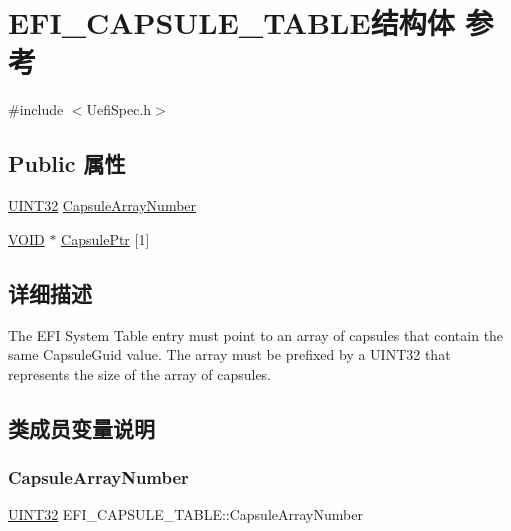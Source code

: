 \hypertarget{struct_e_f_i___c_a_p_s_u_l_e___t_a_b_l_e}{}\section{E\+F\+I\+\_\+\+C\+A\+P\+S\+U\+L\+E\+\_\+\+T\+A\+B\+L\+E结构体 参考}
\label{struct_e_f_i___c_a_p_s_u_l_e___t_a_b_l_e}


{\ttfamily \#include $<$Uefi\+Spec.\+h$>$}

\subsection*{Public 属性}
\begin{DoxyCompactItemize}
\item 
\hyperlink{_processor_bind_8h_ae1e6edbbc26d6fbc71a90190d0266018}{U\+I\+N\+T32} \hyperlink{struct_e_f_i___c_a_p_s_u_l_e___t_a_b_l_e_abfa5aef5d628252d3847e905c250f7b5}{Capsule\+Array\+Number}
\item 
\hyperlink{interfacevoid}{V\+O\+ID} $\ast$ \hyperlink{struct_e_f_i___c_a_p_s_u_l_e___t_a_b_l_e_ac73b66b92796d9820da22cda4d2297a5}{Capsule\+Ptr} \mbox{[}1\mbox{]}
\end{DoxyCompactItemize}


\subsection{详细描述}
The E\+FI System Table entry must point to an array of capsules that contain the same Capsule\+Guid value. The array must be prefixed by a U\+I\+N\+T32 that represents the size of the array of capsules. 

\subsection{类成员变量说明}
\mbox{\label{struct_e_f_i___c_a_p_s_u_l_e___t_a_b_l_e_abfa5aef5d628252d3847e905c250f7b5}} 
\subsubsection{\texorpdfstring{Capsule\+Array\+Number}{CapsuleArrayNumber}}
{\footnotesize\ttfamily \hyperlink{_processor_bind_8h_ae1e6edbbc26d6fbc71a90190d0266018}{U\+I\+N\+T32} E\+F\+I\+\_\+\+C\+A\+P\+S\+U\+L\+E\+\_\+\+T\+A\+B\+L\+E\+::\+Capsule\+Array\+Number}

